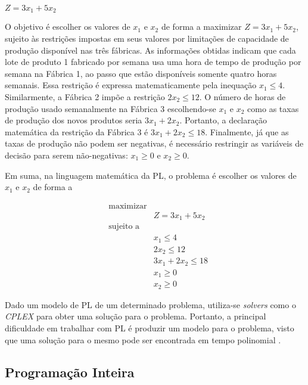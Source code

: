 \begin{alineas}
\item[] $Z = 3x_1 + 5x_2$
\end{alineas}

O objetivo é escolher os valores de $x_1$ e $x_2$ de forma a maximizar $Z = 3x_1 + 5x_2$, sujeito às restrições impostas em seus valores por limitações de capacidade de produção disponível nas três fábricas. As informações obtidas indicam que cada lote de produto 1 fabricado por semana usa uma hora de tempo de produção por semana na Fábrica 1, ao passo que estão disponíveis somente quatro horas semanais. Essa restrição é expressa matematicamente pela inequação $x_1 \leq 4$. Similarmente, a Fábrica 2 impõe a restrição $2x_2 \leq 12$. O número de horas de produção usado semanalmente na Fábrica 3 escolhendo-se $x_1$ e $x_2$ como as taxas de produção dos novos produtos seria $3x_1 + 2x_2$. Portanto, a declaração matemática da restrição da Fábrica 3 é $3x_1 + 2x_2 \leq 18$. Finalmente, já que as taxas de produção não podem ser negativas, é necessário restringir as variáveis de decisão para serem não-negativas: $x_1 \geq 0$ e $x_2 \geq 0$.

Em suma, na linguagem matemática da PL, o problema é escolher os valores de $x_1$ e $x_2$ de forma a

\begin{equation*}
\begin{aligned}
& \text{maximizar} \\
& &  Z = 3x_1 + 5x_2 \\
& \text{sujeito a} \\
& & x_1 \leq 4 \\
& & 2x_2 \leq 12 \\
& & 3x_1 + 2x_2 \leq 18 \\
& & x_1 \geq 0 \\ 
& & x_2 \geq 0
\end{aligned}
\end{equation*}

Dado um modelo de PL de um determinado problema, utiliza-se \textit{solvers} como o \textit{CPLEX} \cite{ibmcplex} para obter uma solução para o problema. Portanto, a principal dificuldade em trabalhar com PL é produzir um modelo para o problema, visto que uma solução para o mesmo pode ser encontrada em tempo polinomial \cite{luenberger1984linear}.



\subsection{Programação Inteira}	

